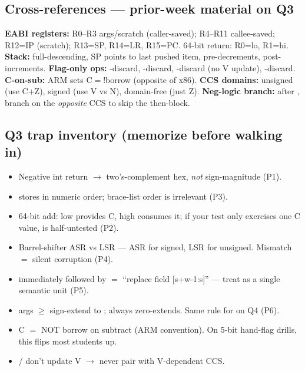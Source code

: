 \subsection{Cross-references --- prior-week material on Q3}
\textbf{EABI registers:} R0--R3 args/scratch (caller-saved); R4--R11 callee-saved; R12=IP (scratch); R13=SP, R14=LR, R15=PC. 64-bit return: R0=lo, R1=hi. \textbf{Stack:} full-descending, SP points to last pushed item,  pre-decrements,  post-increments. \textbf{Flag-only ops:} -discard, -discard, -discard (no V update), -discard. \textbf{C-on-sub:} ARM sets C$=$!borrow (opposite of x86). \textbf{CCS domains:}  unsigned (use C+Z),  signed (use V vs N),  domain-free (just Z). \textbf{Neg-logic branch:} after , branch on the \emph{opposite} CCS to skip the then-block.

\subsection{Q3 trap inventory (memorize before walking in)}
\begin{itemize}
  \item Negative int return $\to$ two's-complement hex, \emph{not} sign-magnitude (P1).
  \item {} stores in numeric order; brace-list order is irrelevant (P3).
  \item 64-bit add: low  provides C, high  consumes it; if your test only exercises one C value,  is half-untested (P2).
  \item Barrel-shifter ASR vs LSR --- ASR for signed, LSR for unsigned. Mismatch $=$ silent corruption (P4).
  \item {} immediately followed by  $=$ ``replace field [s+w-1:s]'' --- treat as a single semantic unit (P5).
  \item {} args $\geq$  sign-extend to ;  always zero-extends. Same rule for  on Q4 (P6).
  \item C $=$ NOT borrow on subtract (ARM convention). On 5-bit hand-flag drills, this flips most students up.
  \item {}/ don't update V $\to$ never pair with V-dependent CCS.
\end{itemize}
